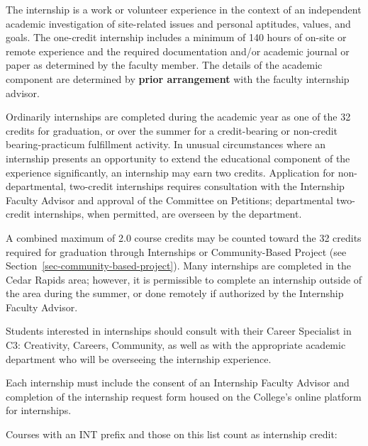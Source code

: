 \documentclass[
  letterpaper,
]{scrbook}
\begin{document}
The internship is a work or volunteer experience in the context of an
independent academic investigation of site-related issues and personal
aptitudes, values, and goals. The one-credit internship includes a
minimum of 140 hours of on-site or remote experience and the required
documentation and/or academic journal or paper as determined by the
faculty member. The details of the academic component are determined by
\textbf{prior arrangement} with the faculty internship advisor.

Ordinarily internships are completed during the academic year as one of
the 32 credits for graduation, or over the summer for a credit-bearing
or non-credit bearing-practicum fulfillment activity. In unusual
circumstances where an internship presents an opportunity to extend the
educational component of the experience significantly, an internship may
earn two credits. Application for non-departmental, two-credit
internships requires consultation with the Internship Faculty Advisor
and approval of the Committee on Petitions; departmental two-credit
internships, when permitted, are overseen by the department.

A combined maximum of 2.0 course credits may be counted toward the 32
credits required for graduation through Internships or Community-Based
Project (see Section~\ref{sec-community-based-project}). Many
internships are completed in the Cedar Rapids area; however, it is
permissible to complete an internship outside of the area during the
summer, or done remotely if authorized by the Internship Faculty
Advisor.

Students interested in internships should consult with their Career
Specialist in C3: Creativity, Careers, Community, as well as with the
appropriate academic department who will be overseeing the internship
experience.

Each internship must include the consent of an Internship Faculty
Advisor and completion of the internship request form housed on the
College's online platform for internships.

Courses with an INT prefix and those on this list count as internship
credit:
\end{document}

